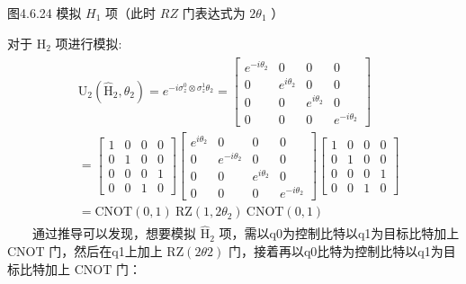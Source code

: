 \documentclass[a4paper,11pt,english]{sphinxmanual}
\begin{document}
\begin{center}图4.6.24 模拟 \(H_1\) 项（此时 \(RZ\) 门表达式为 \(2\theta_{1}\) ）
\end{center}
\sphinxAtStartPar
对于 \(\mathrm{H}_2\) 项进行模拟:
\begin{equation*}
\begin{split}\begin{aligned} &\mathrm{U}_{2}\left(\mathrm{\hat{H}}_{2}, \theta_{2}\right)=e^{-i \sigma_{z}^{0} \otimes \sigma_{z}^{1} \theta_{2}}=\left[\begin{array}{cccc} e^{-i \theta_{2}} & 0 & 0 & 0 \\ 0 & e^{i \theta_{2}} & 0 & 0 \\ 0 & 0 & e^{i \theta_{2}} & 0 \\ 0 & 0 & 0 & e^{-i \theta_{2}} \end{array}\right] \\ &=\left[\begin{array}{cccc} 1 & 0 & 0 & 0 \\ 0 & 1 & 0 & 0 \\ 0 & 0 & 0 & 1 \\ 0 & 0 & 1 & 0 \end{array}\right]\left[\begin{array}{cccc} e^{i \theta_{2}} & 0 & 0 & 0 \\ 0 & e^{-i \theta_{2}} & 0 & 0 \\ 0 & 0 & e^{i \theta_{2}} & 0 \\ 0 & 0 & 0 & e^{-i \theta_{2}} \end{array}\right]\left[\begin{array}{llll} 1 & 0 & 0 & 0 \\ 0 & 1 & 0 & 0 \\ 0 & 0 & 0 & 1 \\ 0 & 0 & 1 & 0 \end{array}\right] \\ &=\text{CNOT}(0,1) \ \text{RZ}\left(1,2 \theta_{2}\right) \ \text{CNOT}(0,1) \end{aligned}\end{split}
\end{equation*}
\sphinxAtStartPar
  通过推导可以发现，想要模拟 \(\mathrm{\hat{H}}_2\) 项，需以q0为控制比特以q1为目标比特加上 \(\mathrm{CNOT}\) 门，然后在q1上加上 \(\mathrm{RZ}(2 \theta{2})\) 门，接着再以q0比特为控制比特以q1为目标比特加上 \(\mathrm{CNOT}\) 门：

\end{document}
